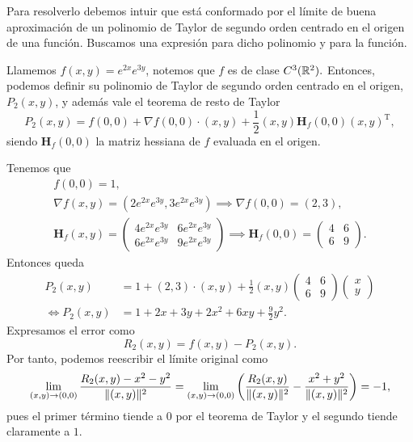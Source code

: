 
\begin{solution}
    Para resolverlo debemos intuir que está conformado por el límite de buena aproximación de un polinomio de Taylor de segundo orden centrado en el origen de una función. Buscamos una expresión para dicho polinomio y para la función.

    Llamemos $f(x,y) = e^{2x}e^{3y}$, notemos que $f$ es de clase $C^3(\mathbb{R}^2).$  Entonces, podemos definir su polinomio de Taylor de segundo orden centrado en el origen, $ P_2(x,y)$, y adem\'as vale el teorema de resto de Taylor
    \[
        P_2(x,y) = f(0,0) + \nabla f(0,0)\cdot(x,y) + \frac{1}{2}(x,y)\boldsymbol{H}_f(0,0)(x,y)^\mathrm{T},
    \]
    siendo $\boldsymbol{H}_f(0,0)$ la matriz hessiana de $f$ evaluada en el origen.

    Tenemos que
    \begin{gather*}
        f(0,0) = 1,\\[.2cm]
        \nabla f(x,y) = \left(2e^{2x}e^{3y}, 3e^{2x}e^{3y}\right) \implies \nabla f(0,0) = (2,3),\\[.25cm]
        \boldsymbol{H}_f(x,y) = \left(\begin{array}{cc}
                4e^{2x}e^{3y} & 6e^{2x}e^{3y} \\[10pt]
                6e^{2x}e^{3y} & 9e^{2x}e^{3y}
            \end{array}\right) \implies \boldsymbol{H}_f(0,0) = \left(\begin{array}{cc}
                4 & 6 \\
                6 & 9
            \end{array}\right).
    \end{gather*}
    Entonces queda
    \[
        \begin{aligned}
            P_2(x,y)      & = 1+(2,3)\cdot(x,y)+\frac{1}{2}(x,y)
            \left(\begin{array}{cc}  
                    4 & 6 \\
                    6 & 9
                \end{array}\right)
            \left(\begin{array}{cc}
                          x \\
                          y
                      \end{array}\right)                                                     \\[4pt]
            \iff P_2(x,y) & = 1 + 2x + 3y + 2x^2 + 6xy + \frac{9}{2}y^2.
        \end{aligned}
    \]
    Expresamos el error como
    \[
        R_2(x,y) = f(x,y) - P_2(x,y).
    \]
    Por tanto, podemos reescribir el límite original como
    \[\\[2pt]
        \lim_{(x,y) \to (0,0)} \frac{R_2(x,y) - x^2 - y^2}{\|(x,y)\|^2} =
        \lim_{(x,y) \to (0,0)} \left( \frac{R_2(x,y)}{\|(x,y)\|^2} - \frac{x^2+y^2}{\|(x,y)\|^2} \right) = -1,
    \]
    pues el primer término tiende a 0 por el teorema de Taylor  y el segundo  tiende claramente a $1.$
\end{solution}


